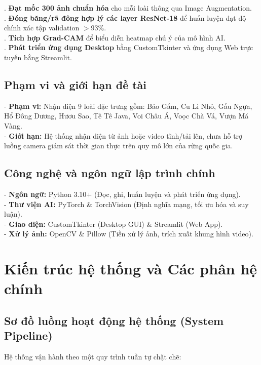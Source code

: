 \documentclass[12pt,a4paper]{report}
\begin{document}
. \textbf{Đạt mốc 300 ảnh chuẩn hóa} cho mỗi loài thông qua Image Augmentation.\\[0.15cm]
. \textbf{Đóng băng/rã đông hợp lý các layer ResNet-18} để huấn luyện đạt độ chính xác tập validation $>$93\%.\\[0.15cm]
. \textbf{Tích hợp Grad-CAM} để biểu diễn heatmap chú ý của mô hình AI.\\[0.15cm]
. \textbf{Phát triển ứng dụng Desktop} bằng CustomTkinter và ứng dụng Web trực tuyến bằng Streamlit.

\section{Phạm vi và giới hạn đề tài}
\noindent - \textbf{Phạm vi:} Nhận diện 9 loài đặc trưng gồm: Báo Gấm, Cu Li Nhỏ, Gấu Ngựa, Hổ Đông Dương, Hươu Sao, Tê Tê Java, Voi Châu Á, Voọc Chà Vá, Vượn Má Vàng.\\[0.15cm]
\noindent - \textbf{Giới hạn:} Hệ thống nhận diện từ ảnh hoặc video tĩnh/tải lên, chưa hỗ trợ luồng camera giám sát thời gian thực trên quy mô lớn của rừng quốc gia.

\section{Công nghệ và ngôn ngữ lập trình chính}
\noindent - \textbf{Ngôn ngữ:} Python 3.10+ (Đọc, ghi, huấn luyện và phát triển ứng dụng).\\[0.15cm]
\noindent - \textbf{Thư viện AI:} PyTorch \& TorchVision (Định nghĩa mạng, tối ưu hóa và suy luận).\\[0.15cm]
\noindent - \textbf{Giao diện:} CustomTkinter (Desktop GUI) \& Streamlit (Web App).\\[0.15cm]
\noindent - \textbf{Xử lý ảnh:} OpenCV \& Pillow (Tiền xử lý ảnh, trích xuất khung hình video).
\newpage

\chapter{Kiến trúc hệ thống và Các phân hệ chính}

\section{Sơ đồ luồng hoạt động hệ thống (System Pipeline)}
Hệ thống vận hành theo một quy trình tuần tự chặt chẽ:\\
\end{document}
